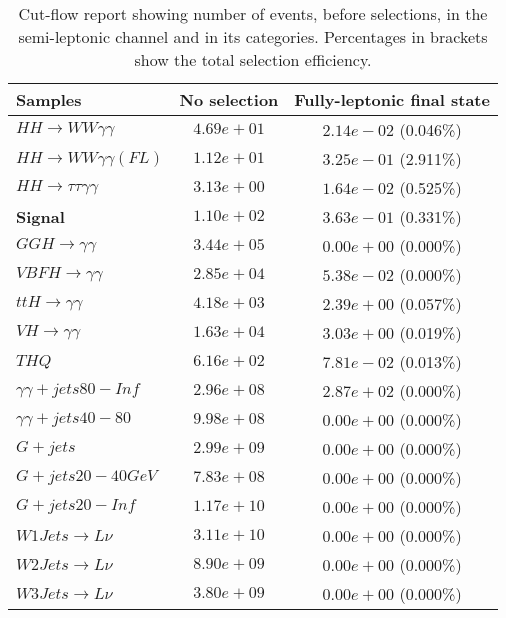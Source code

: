 \begin{table}[h!]
    \centering
    \caption{Cut-flow report showing number of events, before selections, in the semi-leptonic channel and in its categories. Percentages in brackets show the total selection efficiency.}
\begin{tabular}{ |l|c|c| }
    \hline
    Samples                                & No selection & Fully-leptonic final state               \\
    \hline
           $HH \rightarrow WW\gamma\gamma$ &  $4.69e+01$  &  $2.14e-02$ (0.046\%) \\
      $HH \rightarrow WW\gamma\gamma (FL)$ &  $1.12e+01$  &  $3.25e-01$ (2.911\%) \\
     $HH \rightarrow \tau\tau\gamma\gamma$ &  $3.13e+00$  &  $1.64e-02$ (0.525\%) \\
                           \textbf{Signal} &  $1.10e+02$  &  $3.63e-01$ (0.331\%) \\
            $GGH \rightarrow \gamma\gamma$ &  $3.44e+05$  &  $0.00e+00$ (0.000\%) \\
           $VBFH \rightarrow \gamma\gamma$ &  $2.85e+04$  &  $5.38e-02$ (0.000\%) \\
            $ttH \rightarrow \gamma\gamma$ &  $4.18e+03$  &  $2.39e+00$ (0.057\%) \\
             $VH \rightarrow \gamma\gamma$ &  $1.63e+04$  &  $3.03e+00$ (0.019\%) \\
                                     $THQ$ &  $6.16e+02$  &  $7.81e-02$ (0.013\%) \\
              $\gamma\gamma + jets 80-Inf$ &  $2.96e+08$  &  $2.87e+02$ (0.000\%) \\
               $\gamma\gamma + jets 40-80$ &  $9.98e+08$  &  $0.00e+00$ (0.000\%) \\
                                  $G+jets$ &  $2.99e+09$  &  $0.00e+00$ (0.000\%) \\
                         $G+jets 20-40GeV$ &  $7.83e+08$  &  $0.00e+00$ (0.000\%) \\
                           $G+jets 20-Inf$ &  $1.17e+10$  &  $0.00e+00$ (0.000\%) \\
                 $W1Jets \rightarrow L\nu$ &  $3.11e+10$  &  $0.00e+00$ (0.000\%) \\
                 $W2Jets \rightarrow L\nu$ &  $8.90e+09$  &  $0.00e+00$ (0.000\%) \\
                 $W3Jets \rightarrow L\nu$ &  $3.80e+09$  &  $0.00e+00$ (0.000\%) \\

\end{tabular}
\end{table}
